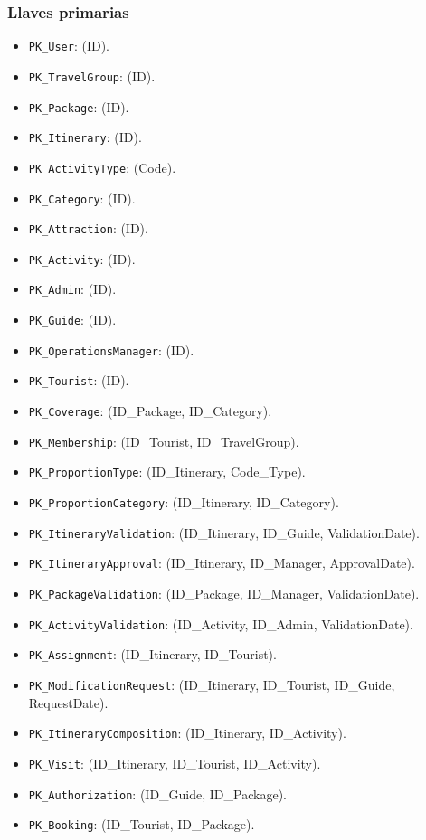 \documentclass[11pt,a4paper]{article}
\begin{document}
\subsubsection*{Llaves primarias}
\begin{itemize}[leftmargin=1.2em,itemsep=2pt,topsep=3pt]
\item \texttt{PK\_\allowbreak{}User}: (ID).
\item \texttt{PK\_\allowbreak{}TravelGroup}: (ID).
\item \texttt{PK\_\allowbreak{}Package}: (ID).
\item \texttt{PK\_\allowbreak{}Itinerary}: (ID).
\item \texttt{PK\_\allowbreak{}ActivityType}: (Code).
\item \texttt{PK\_\allowbreak{}Category}: (ID).
\item \texttt{PK\_\allowbreak{}Attraction}: (ID).
\item \texttt{PK\_\allowbreak{}Activity}: (ID).
\item \texttt{PK\_\allowbreak{}Admin}: (ID).
\item \texttt{PK\_\allowbreak{}Guide}: (ID).
\item \texttt{PK\_\allowbreak{}OperationsManager}: (ID).
\item \texttt{PK\_\allowbreak{}Tourist}: (ID).
\item \texttt{PK\_\allowbreak{}Coverage}: (ID\_Package, ID\_Category).
\item \texttt{PK\_\allowbreak{}Membership}: (ID\_Tourist, ID\_TravelGroup).
\item \texttt{PK\_\allowbreak{}ProportionType}: (ID\_Itinerary, Code\_Type).
\item \texttt{PK\_\allowbreak{}ProportionCategory}: (ID\_Itinerary, ID\_Category).
\item \texttt{PK\_\allowbreak{}ItineraryValidation}: (ID\_Itinerary, ID\_Guide, ValidationDate).
\item \texttt{PK\_\allowbreak{}ItineraryApproval}: (ID\_Itinerary, ID\_Manager, ApprovalDate).
\item \texttt{PK\_\allowbreak{}PackageValidation}: (ID\_Package, ID\_Manager, ValidationDate).
\item \texttt{PK\_\allowbreak{}ActivityValidation}: (ID\_Activity, ID\_Admin, ValidationDate).
\item \texttt{PK\_\allowbreak{}Assignment}: (ID\_Itinerary, ID\_Tourist).
\item \texttt{PK\_\allowbreak{}ModificationRequest}: (ID\_Itinerary, ID\_Tourist, ID\_Guide, RequestDate).
\item \texttt{PK\_\allowbreak{}ItineraryComposition}: (ID\_Itinerary, ID\_Activity).
\item \texttt{PK\_\allowbreak{}Visit}: (ID\_Itinerary, ID\_Tourist, ID\_Activity).
\item \texttt{PK\_\allowbreak{}Authorization}: (ID\_Guide, ID\_Package).
\item \texttt{PK\_\allowbreak{}Booking}: (ID\_Tourist, ID\_Package).
\end{itemize}
\end{document}
